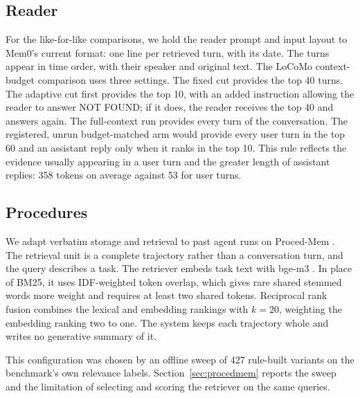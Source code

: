 \subsection{Reader}
For the like-for-like comparisons, we hold the reader prompt and input layout to Mem0's current format: one line per retrieved turn, with its date. The turns appear in time order, with their speaker and original text. The LoCoMo context-budget comparison uses three settings. The fixed cut provides the top 40 turns. The adaptive cut first provides the top 10, with an added instruction allowing the reader to answer NOT FOUND; if it does, the reader receives the top 40 and answers again. The full-context run provides every turn of the conversation. The registered, unrun budget-matched \lmes{} arm would provide every user turn in the top 60 and an assistant reply only when it ranks in the top 10. This rule reflects the evidence usually appearing in a user turn and the greater length of assistant replies: 358 tokens on average against 53 for user turns.

\subsection{Procedures}
\label{sec:procedures}
We adapt verbatim storage and retrieval to past agent runs on Proced-Mem \citep{procedmem}. The retrieval unit is a complete trajectory rather than a conversation turn, and the query describes a task. The retriever embeds task text with bge-m3 \citep{chen2024bgem3}. In place of BM25, it uses IDF-weighted token overlap, which gives rare shared stemmed words more weight and requires at least two shared tokens. Reciprocal rank fusion combines the lexical and embedding rankings with $k = 20$, weighting the embedding ranking two to one. The system keeps each trajectory whole and writes no generative summary of it.

This configuration was chosen by an offline sweep of 427 rule-built variants on the benchmark's own relevance labels. Section~\ref{sec:procedmem} reports the sweep and the limitation of selecting and scoring the retriever on the same queries.
